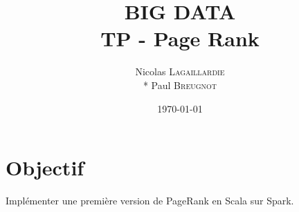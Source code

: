 \documentclass{article}
\title{BIG DATA \\ TP - Page Rank} %
\author{Nicolas \textsc{Lagaillardie} \\* Paul \textsc{Breugnot}} %
\date{\today} %
\begin{document}
\maketitle %

\tableofcontents
\newpage




\section{Objectif}

Impl\'{e}menter une premi\`{e}re version de PageRank en Scala sur Spark.


\end{document}
